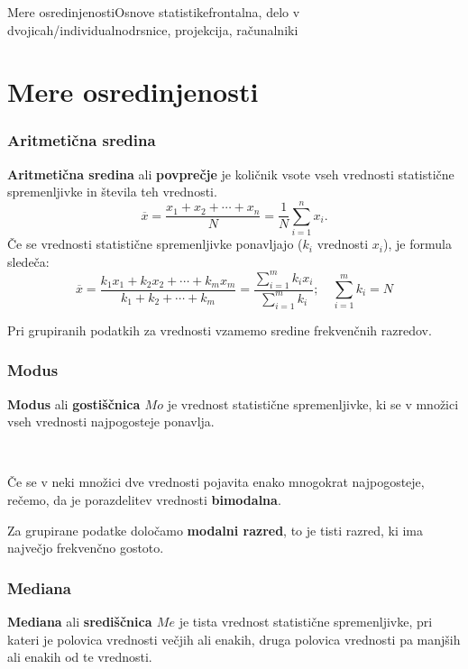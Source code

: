 \begin{priprava}{3}{}{Mere osredinjenosti}{Osnove statistike}{frontalna, delo v dvojicah/individualno}{drsnice, projekcija, računalniki}

    \section{Mere osredinjenosti}

        

    \subsubsection{Aritmetična sredina}
        \textbf{Aritmetična sredina} ali \textbf{povprečje} je količnik vsote vseh vrednosti 
        statistične spremenljivke in števila teh vrednosti. \\

        $$\overline{x}=\dfrac{x_1+x_2+\cdots+x_n}{N}=\dfrac{1}{N}\sum_{i=1}^n x_i.$$
        Če se vrednosti statistične spremenljivke ponavljajo ($k_i$ vrednosti $x_i$), je formula sledeča:
        $$\overline{x}=\dfrac{k_1x_1+k_2x_2+\cdots+k_mx_m}{k_1+k_2+\cdots+k_m}=\dfrac{\sum_{i=1}^mk_ix_i}{\sum_{i=1}^mk_i}; \quad \sum_{i=1}^mk_i=N$$

       

    
        Pri grupiranih podatkih za vrednosti vzamemo sredine frekvenčnih razredov.
    




    \subsubsection{Modus}
        \textbf{Modus} ali \textbf{gostiščnica $Mo$} je vrednost statistične spremenljivke, ki se v množici vseh vrednosti najpogosteje ponavlja.                 
    
            ~
    
        Če se v neki množici dve vrednosti pojavita enako mnogokrat najpogosteje, rečemo, da je porazdelitev vrednosti \textbf{bimodalna}.
    

    
        Za grupirane podatke določamo \textbf{modalni razred}, to je tisti razred, ki ima največjo frekvenčno gostoto.
    



    \subsubsection{Mediana}
        \textbf{Mediana} ali \textbf{središčnica $Me$} je tista vrednost statistične spremenljivke, pri kateri je polovica vrednosti večjih ali enakih,
        druga polovica vrednosti pa manjših ali enakih od te vrednosti.                 
    

\end{priprava}
